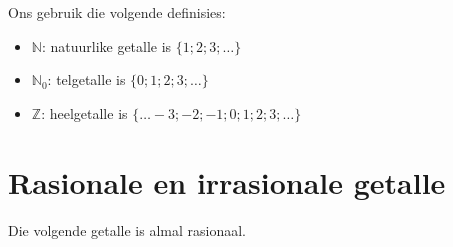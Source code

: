 \par 
Ons gebruik die volgende definisies:\par 
\begin{itemize}[itemsep=5pt]
\item $\mathbb{N}$: natuurlike getalle is $\{1; 2; 3; \ldots\}$
\item $\mathbb{N}_0$: telgetalle is $\{0; 1; 2; 3; \ldots\}$
\item $\mathbb{Z}$: heelgetalle is $\{\ldots -3; -2; -1; 0; 1; 2; 3; \ldots\}$
\end{itemize}

\par
{}

\section{Rasionale en irrasionale getalle}
\nopagebreak



Die volgende getalle is almal rasionaal.\par 
\nopagebreak\noindent{}

